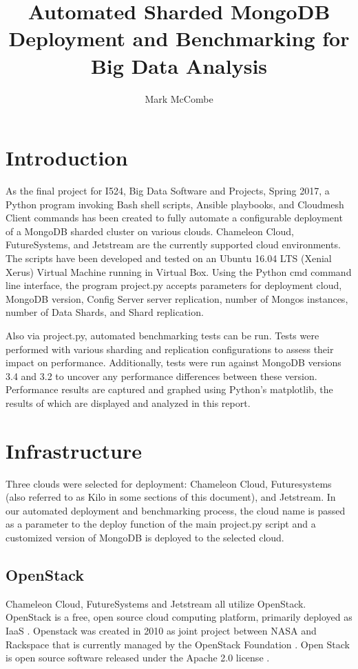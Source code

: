 \documentclass[9pt,twocolumn,twoside]{../../styles/osajnl}
\title{Automated Sharded MongoDB Deployment and Benchmarking for Big Data Analysis}
\author[1,*]{Mark McCombe}
\affil[1]{School of Informatics and Computing, Bloomington, IN 47408, U.S.A.}
\affil[*]{Corresponding author: mmccombe@iu.edu}
\begin{document}
\maketitle

\section{Introduction}

As the final project for I524, Big Data Software and Projects, Spring 2017, a Python program invoking Bash shell scripts, Ansible playbooks, and Cloudmesh Client commands has been created to fully automate a configurable deployment of a MongoDB sharded cluster on various clouds.  Chameleon Cloud, FutureSystems, and Jetstream are the currently supported cloud environments.  The scripts have been developed and tested on an Ubuntu 16.04 LTS (Xenial Xerus) Virtual Machine running in Virtual Box.  Using the Python cmd command line interface, the program project.py accepts parameters for deployment cloud, MongoDB version, Config Server server replication, number of Mongos instances, number of Data Shards, and Shard replication.

Also via project.py, automated benchmarking tests can be run.  Tests were performed with various sharding and replication configurations to assess their impact on performance.  Additionally, tests were run against MongoDB versions 3.4 and 3.2 to uncover any performance differences between these version.  Performance results are captured and graphed using Python's matplotlib, the results of which are displayed and analyzed in this report.

\section{Infrastructure}

Three clouds were selected for deployment: Chameleon Cloud, Futuresystems (also referred to as Kilo in some sections of this document), and Jetstream.  In our automated deployment and benchmarking process, the cloud name is passed as a parameter to the deploy function of the main project.py script and a customized version of MongoDB is deployed to the selected cloud.

\subsection{OpenStack}

Chameleon Cloud, FutureSystems and Jetstream all utilize OpenStack.  OpenStack is a free, open source cloud computing platform, primarily deployed as IaaS  \cite{www-wikiOpenStack}.  Openstack was created in 2010 as joint project between NASA and Rackspace that is currently managed by the OpenStack Foundation  \cite{www-wikiOpenStack}. Open Stack is open source software released under the Apache 2.0 license  \cite{www-openStackFAQ}.
\end{document}
